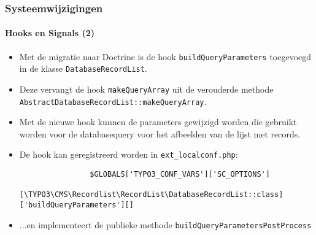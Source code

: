\begin{frame}[fragile]
	\frametitle{Systeemwijzigingen}
	\framesubtitle{Hooks en Signals (2)}

	\lstset{basicstyle=\tiny\ttfamily}

	\begin{itemize}

		\item Met de migratie naar Doctrine is de hook \texttt{buildQueryParameters} toegevoegd in de klasse
			\texttt{DatabaseRecordList}.

		\item Deze vervangt de hook \texttt{makeQueryArray} uit de verouderde methode
			\texttt{AbstractDatabaseRecordList::makeQueryArray}.

		\item Met de nieuwe hook kunnen de parameters gewijzigd worden die gebruikt worden voor de databasequery
			voor het afbeelden van de lijst met records.

		\item De hook kan geregistreerd worden in \texttt{ext\_localconf.php}:

			\begin{lstlisting}
				$GLOBALS['TYPO3_CONF_VARS']['SC_OPTIONS']
				  [\TYPO3\CMS\Recordlist\RecordList\DatabaseRecordList::class]['buildQueryParameters'][]
			\end{lstlisting}

		\item ...en implementeert de publieke methode \texttt{buildQueryParametersPostProcess}

	\end{itemize}

\end{frame}

